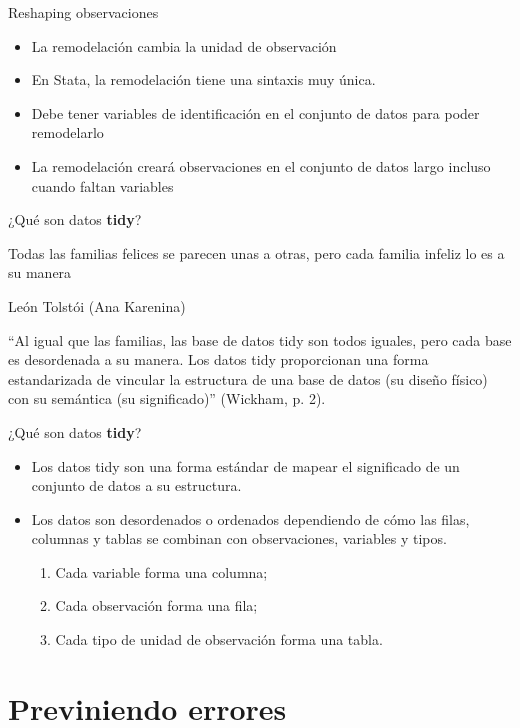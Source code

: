 \documentclass[10pt, aspectratio=169, compress]{beamer}
\begin{document}
\begin{frame}{Reshaping observaciones}
	\begin{itemize}
		\item La remodelación cambia la unidad de observación
		\item En Stata, la remodelación tiene una sintaxis muy única.
		\item Debe tener variables de identificación en el conjunto de datos para poder remodelarlo
		\item La remodelación creará observaciones en el conjunto de datos largo incluso cuando faltan variables		
	\end{itemize}
\end{frame}
\begin{frame}{¿Qué son datos \textbf{tidy}?}
	\epigraph{Todas las familias felices se parecen unas a otras, pero cada familia infeliz lo es a su manera}{León Tolstói (Ana Karenina)}

	``Al igual que las familias, las base de datos tidy son todos iguales, pero cada base es desordenada a su manera. Los datos tidy proporcionan una forma estandarizada de vincular la estructura de una base de datos (su diseño físico) con su semántica (su significado)'' (Wickham, p. 2).
\end{frame}
\begin{frame}{¿Qué son datos \textbf{tidy}?}
	\begin{itemize}
		\item Los datos tidy son una forma estándar de mapear el significado de un conjunto de datos a su estructura. 
		\item Los datos son desordenados o ordenados dependiendo de cómo las filas, columnas y tablas se combinan con observaciones, variables y tipos.
		\begin{enumerate}
			\item Cada variable forma una columna;
			\item Cada observación forma una fila; 
			\item Cada tipo de unidad de observación forma una tabla.
		\end{enumerate}
	\end{itemize}
\end{frame}
\section{Previniendo errores}
\end{document}
